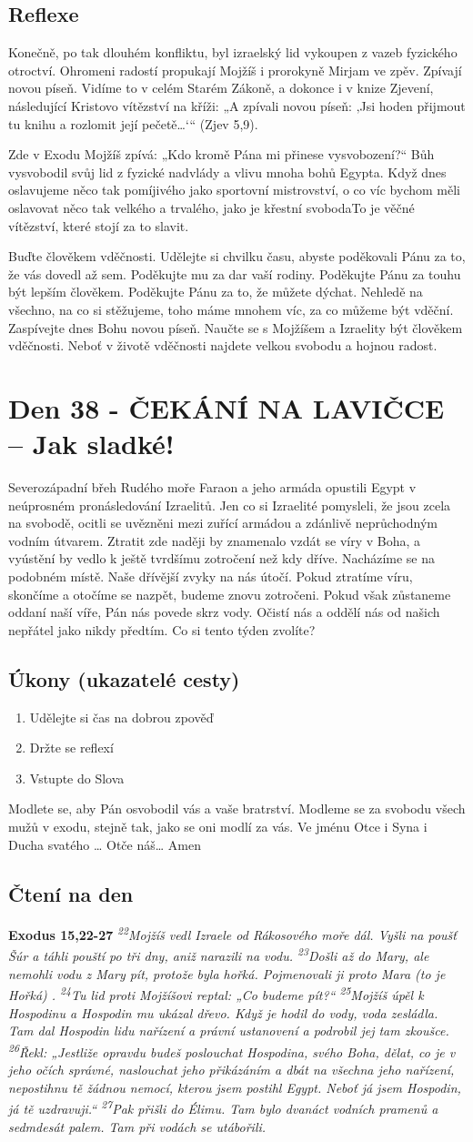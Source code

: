\documentclass[11pt]{article}
\newcommand{\zacatekSestyTyden}{
  Severozápadní břeh Rudého moře \newline 
  Faraon a jeho armáda opustili Egypt v neúprosném pronásledování Izraelitů. Jen co si Izraelité pomysleli, že jsou zcela na svobodě, ocitli se uvězněni mezi zuřící armádou a zdánlivě neprůchodným vodním útvarem. Ztratit zde naději by znamenalo vzdát se víry v Boha, a vyústění by vedlo k ještě tvrdšímu zotročení než kdy dříve. Nacházíme se na podobném místě. Naše dřívější zvyky na nás útočí. Pokud ztratíme víru, skončíme a otočíme se nazpět, budeme znovu zotročeni. Pokud však zůstaneme oddaní naší víře, Pán nás povede skrz vody. Očistí nás a oddělí nás od našich nepřátel jako nikdy předtím. Co si tento týden zvolíte?

\subsection*{Úkony (ukazatelé cesty)}
\begin{enumerate}
  \item Udělejte si čas na dobrou zpověď
  \item Držte se reflexí
  \item Vstupte do Slova
\end{enumerate}
Modlete se, aby Pán osvobodil vás a vaše bratrství. \newline
Modleme se za svobodu všech mužů v exodu, stejně tak, jako se oni modlí za vás.\newline
Ve jménu Otce i Syna i Ducha svatého …  Otče náš… Amen
}
\begin{document}
\subsection*{Reflexe}
Konečně, po tak dlouhém konfliktu, byl izraelský lid vykoupen z vazeb fyzického otroctví. Ohromeni radostí propukají Mojžíš i
prorokyně Mirjam ve zpěv. Zpívají novou píseň. Vidíme to v celém Starém Zákoně, a dokonce i v knize Zjevení, následující
Kristovo vítězství na kříži: „A zpívali novou píseň: ‚Jsi hoden přijmout tu knihu a rozlomit její pečetě…‘“ (Zjev 5,9).

Zde v Exodu Mojžíš zpívá: „Kdo kromě Pána mi přinese vysvobození?“ Bůh vysvobodil svůj lid z fyzické nadvlády a vlivu mnoha
bohů Egypta. Když dnes oslavujeme něco tak pomíjivého jako sportovní mistrovství, o co víc bychom měli oslavovat něco tak
velkého a trvalého, jako je křestní svobodaTo je věčné vítězství, které stojí za to slavit.

Buďte člověkem vděčnosti. Udělejte si chvilku času, abyste poděkovali Pánu za to, že vás dovedl až sem. Poděkujte mu za dar vaší
rodiny. Poděkujte Pánu za touhu být lepším člověkem. Poděkujte Pánu za to, že můžete dýchat. Nehledě na všechno, na co si
stěžujeme, toho máme mnohem víc, za co můžeme být vděční. Zaspívejte dnes Bohu novou píseň. Naučte se s Mojžíšem a
Izraelity být člověkem vděčnosti. Neboť v životě vděčnosti najdete velkou svobodu a hojnou radost.


\newpage
\section{Den 38 - ČEKÁNÍ NA LAVIČCE – Jak sladké!}
\zacatekSestyTyden
\subsection*{Čtení na den}
\textbf{Exodus 15,22-27}
\newline
\textit{
\textsuperscript{22}Mojžíš vedl Izraele od Rákosového moře dál. Vyšli na poušť Šúr a táhli pouští po tři dny, aniž narazili na vodu.
\textsuperscript{23}Došli až do Mary, ale nemohli vodu z Mary pít, protože byla hořká. Pojmenovali ji proto Mara (to je Hořká) .
\textsuperscript{24}Tu lid proti Mojžíšovi reptal: „Co budeme pít?“
\textsuperscript{25}Mojžíš úpěl k Hospodinu a Hospodin mu ukázal dřevo. Když je hodil do vody, voda zesládla. Tam dal Hospodin lidu nařízení a právní ustanovení a podrobil jej tam zkoušce.
\textsuperscript{26}Řekl: „Jestliže opravdu budeš poslouchat Hospodina, svého Boha, dělat, co je v jeho očích správné, naslouchat jeho přikázáním a dbát na všechna jeho nařízení, nepostihnu tě žádnou nemocí, kterou jsem postihl Egypt. Neboť já jsem Hospodin, já tě uzdravuji.“
\textsuperscript{27}Pak přišli do Élimu. Tam bylo dvanáct vodních pramenů a sedmdesát palem. Tam při vodách se utábořili.
}
\end{document}
